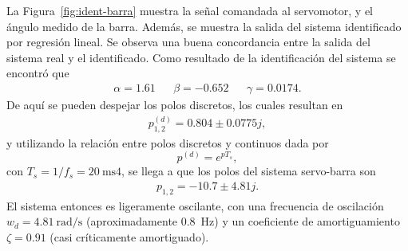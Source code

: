 La Figura~\ref{fig:ident-barra} muestra la señal comandada al servomotor, y el ángulo medido de la barra. Además, se muestra la salida del sistema identificado por regresión lineal. Se observa una buena concordancia entre la salida del sistema real y el identificado. Como resultado de la identificación del sistema se encontró que
\begin{align*}
    \alpha = 1.61 && \beta = -0.652 && \gamma = 0.0174.
\end{align*}
De aquí se pueden despejar los polos discretos, los cuales resultan en
\begin{align*}
    p_{1,2}^{(d)} = 0.804 \pm 0.0775j,
\end{align*}
y utilizando la relación entre polos discretos y continuos dada por
\[
    p^{(d)} = e^{p T_s},
\]
con $T_s = 1/f_s = \qty{20}{\ms}4$, se llega a que los polos del sistema servo-barra son
\begin{align*}
    p_{1,2} = -10.7 \pm 4.81j.
\end{align*}
El sistema entonces es ligeramente oscilante, con una frecuencia de oscilación $w_d = \qty{4.81}{\radian\per\s}$ (aproximadamente \qty{0.8}{\Hz}) y un coeficiente de amortiguamiento $\zeta = 0.91$ (casi críticamente amortiguado).

